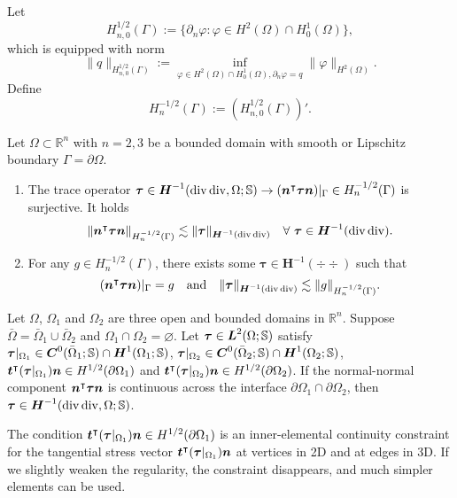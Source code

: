 Let
\[
H_{n,0}^{1/2}(\Gamma):=\{\partial_{n}\varphi: \varphi\in H^2(\Omega)\cap H_0^1(\Omega)\},
\]
which is equipped with norm
\[
\|q\|_{H_{n,0}^{1/2}(\Gamma)}:=\inf_{\varphi\in H^2(\Omega)\cap H_0^1(\Omega), \partial_{n}\varphi=q}\|\varphi\|_{H^2(\Omega)}.
\]
Define
\[
H_{n}^{-1/2}(\Gamma):=\left(H_{n,0}^{1/2}(\Gamma)\right)'.
\]
\begin{lemma}
Let $\Omega\subset\mathbb R^n$ with $n=2,3$ be a bounded domain with smooth or Lipschitz boundary
$\Gamma=\partial\Omega$.
\begin{enumerate}[label=(\alph*)]
\item The trace operator $\boldsymbol\tau\in\boldsymbol{H}^{-1}(\operatorname{div}\operatorname{div},\Omega; \mathbb{S})\to (\boldsymbol{n}^{\intercal}\boldsymbol\tau\boldsymbol{n})|_{\Gamma}\in H_{n}^{-1/2}(\Gamma)$ is surjective.
It holds
\[
\|\boldsymbol{n}^{\intercal}\boldsymbol\tau\boldsymbol{n}\|_{H_{n}^{-1/2}(\Gamma)}\lesssim \|\boldsymbol\tau\|_{\boldsymbol{H}^{-1}(\operatorname{div}\operatorname{div})}\quad\forall~\boldsymbol\tau\in\boldsymbol{H}^{-1}(\operatorname{div}\operatorname{div}).
\]
\item For any $g\in H_{n}^{-1/2}(\Gamma)$, there exists some $\boldsymbol\tau\in\boldsymbol{H}^{-1}(\div\div)$ such that
\[
(\boldsymbol{n}^{\intercal}\boldsymbol\tau\boldsymbol{n})|_{\Gamma}=g\quad\textrm{and}\quad \|\boldsymbol\tau\|_{\boldsymbol{H}^{-1}(\operatorname{div}\operatorname{div})}\lesssim \|g\|_{H_{n}^{-1/2}(\Gamma)}.
\]
\end{enumerate}
\end{lemma}


\begin{lemma}\label{lem:Hdivdivcontinuous}
Let $\Omega$, $\Omega_1$ and $\Omega_2$ are three open and bounded domains in $\mathbb R^n$. Suppose
$\bar{\Omega}=\bar{\Omega}_1\cup \bar{\Omega}_2$ and $\Omega_1\cap \Omega_2=\varnothing$. Let $\boldsymbol\tau\in \boldsymbol L^2(\Omega;\mathbb S)$ satisfy $\boldsymbol\tau|_{\Omega_1}\in \boldsymbol{C}^{0}(\bar{\Omega}_1;\mathbb S)\cap \boldsymbol{H}^1(\Omega_1;\mathbb S)$, $\boldsymbol\tau|_{\Omega_2}\in \boldsymbol{C}^{0}(\bar{\Omega}_2;\mathbb S)\cap \boldsymbol{H}^1(\Omega_2;\mathbb S)$, $\boldsymbol{t}^{\intercal}(\boldsymbol\tau|_{\Omega_1})\boldsymbol{n}\in H^{1/2}(\partial\Omega_1)$ and $\boldsymbol{t}^{\intercal}(\boldsymbol\tau|_{\Omega_2})\boldsymbol{n}\in H^{1/2}(\partial\Omega_2)$.
If the normal-normal component $\boldsymbol{n}^{\intercal}\boldsymbol\tau\boldsymbol{n}$ is continuous across the interface $\partial\Omega_1\cap\partial\Omega_2$, then $\boldsymbol\tau\in \boldsymbol{H}^{-1}(\operatorname{div}\operatorname{div},\Omega; \mathbb{S})$.
\end{lemma}
\begin{remark}
The condition $\boldsymbol{t}^{\intercal}(\boldsymbol\tau|_{\Omega_1})\boldsymbol{n}\in H^{1/2}(\partial\Omega_1)$ is an inner-elemental continuity
constraint for the tangential stress vector $\boldsymbol{t}^{\intercal}(\boldsymbol\tau|_{\Omega_1})\boldsymbol{n}$ at vertices in 2D and at edges in 3D.
If we slightly weaken the regularity, the constraint disappears, and much simpler
elements can be used.
\end{remark}

